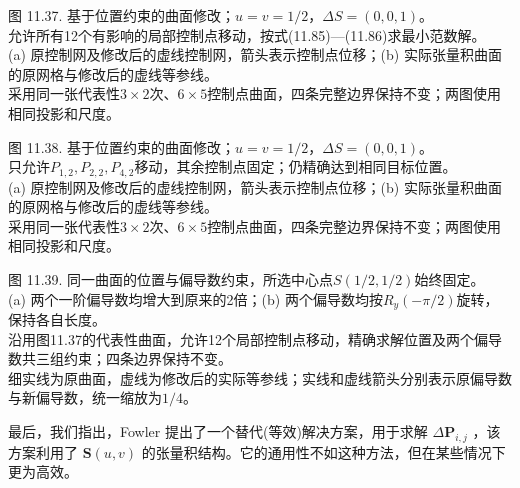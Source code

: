 \documentclass[../main.tex]{subfiles}
\begin{document}
\begin{center}
\begin{minipage}{37cm}
\centering
{}
\par\smallskip
图 11.37. 基于位置约束的曲面修改；$u=v=1/2$，$\Delta S=(0,0,1)$。\\
允许所有12个有影响的局部控制点移动，按式(11.85)—(11.86)求最小范数解。\\
(a) 原控制网及修改后的虚线控制网，箭头表示控制点位移；(b) 实际张量积曲面的原网格与修改后的虚线等参线。\\
采用同一张代表性$3\times2$次、$6\times5$控制点曲面，四条完整边界保持不变；两图使用相同投影和尺度。
\end{minipage}
\end{center}

\begin{center}
\begin{minipage}{37cm}
\centering
{}
\par\smallskip
图 11.38. 基于位置约束的曲面修改；$u=v=1/2$，$\Delta S=(0,0,1)$。\\
只允许$P_{1,2},P_{2,2},P_{4,2}$移动，其余控制点固定；仍精确达到相同目标位置。\\
(a) 原控制网及修改后的虚线控制网，箭头表示控制点位移；(b) 实际张量积曲面的原网格与修改后的虚线等参线。\\
采用同一张代表性$3\times2$次、$6\times5$控制点曲面，四条完整边界保持不变；两图使用相同投影和尺度。
\end{minipage}
\end{center}

\begin{center}
\begin{minipage}{37cm}
\centering
{}
\par\smallskip
图 11.39. 同一曲面的位置与偏导数约束，所选中心点$S(1/2,1/2)$始终固定。\\
(a) 两个一阶偏导数均增大到原来的2倍；(b) 两个偏导数均按$R_y(-\pi/2)$旋转，保持各自长度。\\
沿用图11.37的代表性曲面，允许12个局部控制点移动，精确求解位置及两个偏导数共三组约束；四条边界保持不变。\\
细实线为原曲面，虚线为修改后的实际等参线；实线和虚线箭头分别表示原偏导数与新偏导数，统一缩放为$1/4$。
\end{minipage}
\end{center}

最后，我们指出，Fowler \cite{Fowl92} 提出了一个替代(等效)解决方案，用于求解 \(\Delta {\mathbf{P}}_{i,j}\) ，该方案利用了 \(\mathbf{S}\left( {u,v}\right)\) 的张量积结构。它的通用性不如这种方法，但在某些情况下更为高效。


\clearpage
    
\end{document}
